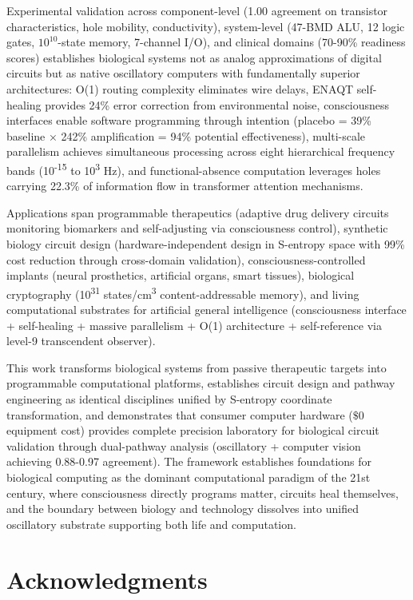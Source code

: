 \documentclass[11pt,a4paper]{article}
\begin{document}
Experimental validation across component-level (1.00 agreement on transistor characteristics, hole mobility, conductivity), system-level (47-BMD ALU, 12 logic gates, $10^{10}$-state memory, 7-channel I/O), and clinical domains (70-90\% readiness scores) establishes biological systems not as analog approximations of digital circuits but as native oscillatory computers with fundamentally superior architectures: O(1) routing complexity eliminates wire delays, ENAQT self-healing provides 24\% error correction from environmental noise, consciousness interfaces enable software programming through intention (placebo = 39\% baseline × 242\% amplification = 94\% potential effectiveness), multi-scale parallelism achieves simultaneous processing across eight hierarchical frequency bands (10\textsuperscript{-15} to 10\textsuperscript{3} Hz), and functional-absence computation leverages holes carrying 22.3\% of information flow in transformer attention mechanisms.

Applications span programmable therapeutics (adaptive drug delivery circuits monitoring biomarkers and self-adjusting via consciousness control), synthetic biology circuit design (hardware-independent design in S-entropy space with 99\% cost reduction through cross-domain validation), consciousness-controlled implants (neural prosthetics, artificial organs, smart tissues), biological cryptography (10\textsuperscript{31} states/cm\textsuperscript{3} content-addressable memory), and living computational substrates for artificial general intelligence (consciousness interface + self-healing + massive parallelism + O(1) architecture + self-reference via level-9 transcendent observer).

This work transforms biological systems from passive therapeutic targets into programmable computational platforms, establishes circuit design and pathway engineering as identical disciplines unified by S-entropy coordinate transformation, and demonstrates that consumer computer hardware ($\$0$ equipment cost) provides complete precision laboratory for biological circuit validation through dual-pathway analysis (oscillatory + computer vision achieving 0.88-0.97 agreement). The framework establishes foundations for biological computing as the dominant computational paradigm of the 21st century, where consciousness directly programs matter, circuits heal themselves, and the boundary between biology and technology dissolves into unified oscillatory substrate supporting both life and computation.

\section*{Acknowledgments}
\end{document}
